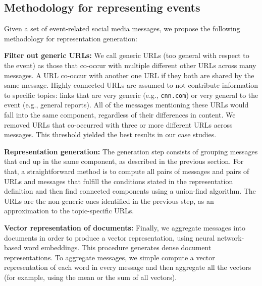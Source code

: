 \subsection*{Methodology for representing events}

Given a set of event-related social media messages, we propose the following
methodology for representation generation:
  
{\bf Filter out generic URLs:} 
%
We call generic URLs (too general with respect to the event) as those that
co-occur with multiple different other URLs across many messages.
%
A URL co-occur with another one URL if they both are shared by the same message.
%
Highly connected URLs are assumed to not contribute information to specific topics: 
links that are very generic (e.g., {\tt cnn.com}) or very general to the event 
(e.g., general reports). 
%
All of the messages mentioning these URLs would fall into the same component,
regardless of their differences in content. 
%
We removed URLs that co-occurred with three or more different URLs across
messages.
%
This threshold yielded the best results in our case studies.


{\bf Representation generation:} 
%
The generation step consists of grouping messages that end up in the same
component, as described in the previous section.
%
For that, a straightforward method is to compute all pairs of messages and pairs
of URLs and messages that fulfill the conditions stated in the representation
definition and then find connected components using a union-find algorithm.
%
The URLs are the non-generic ones identified in the previous step, as an
approximation to the topic-specific URLs.


{\bf Vector representation of documents:} 
%
Finally, we aggregate messages into documents in order to produce a vector
representation, using neural network-based word embeddings.
%
This procedure generates dense document representations.
%
To aggregate messages, we simple compute a vector representation of each word in every message and 
then aggregate all the vectors (for example, using the mean or the sum of all vectors).







